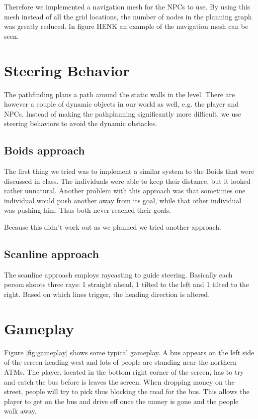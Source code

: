 \documentclass[a4paper,pdf,12pt]{article}
\begin{document}
Therefore we implemented a navigation mesh for the NPCs to use. By using this mesh instead of all the grid locations, the number of nodes in the planning graph was greatly reduced. In figure HENK an example of the navigation mesh can be seen. 


\section{Steering Behavior}
\label{sec:Steering Behavior}

The pathfinding plans a path around the static walls in the level. There are however a couple of dynamic objects in our world as well, e.g. the player and NPCs. Instead of making the pathplanning significantly more difficult, we use steering behaviors to avoid the dynamic obstacles. 

\subsection{Boids approach}
The first thing we tried was to implement a similar system to the Boids that were discussed in class\cite{reynolds1987flocks}. The individuals were able to keep their distance, but it looked rather unnatural. Another problem with this approach was that sometimes one individual would push another away from its goal, while that other individual was pushing him. Thus both never reached their goals.

Because this didn't work out as we planned we tried another approach.

\subsection{Scanline approach}
The scanline approach employs raycasting to guide steering. Basically each person shoots three rays: 1 straight ahead, 1 tilted to the left and 1 tilted to the right. Based on which lines trigger, the heading direction is altered.

\section{Gameplay}
\label{sec:Gameplay}
Figure \ref{fig:gameplay} shows some typical gameplay. A bus appears on the left side of the screen heading west and lots of people are standing near the northern ATMs. The player, located in the bottom right corner of the screen, has to try and catch the bus before is leaves the screen. When dropping money on the street, people will try to pick thus blocking the road for the bus. This allows the player to get on the bus and drive off once the money is gone and the people walk away.
\end{document}
